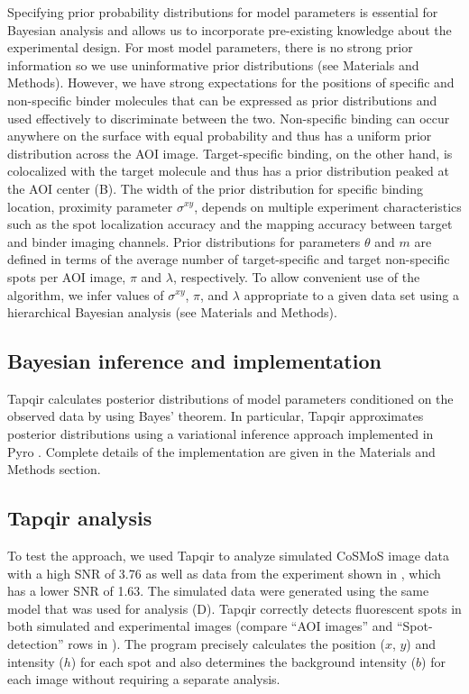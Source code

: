 Specifying prior probability distributions for model parameters is essential for Bayesian analysis and allows us to incorporate pre-existing knowledge about the experimental design. For most model parameters, there is no strong prior information so we use uninformative prior distributions (see Materials and Methods). However, we have strong expectations for the positions of specific and non-specific binder molecules that can be expressed as prior distributions and used effectively to discriminate between the two. Non-specific binding can occur anywhere on the surface with equal probability and thus has a uniform prior distribution across the AOI image. Target-specific binding, on the other hand, is colocalized with the target molecule and thus has a prior distribution peaked at the AOI center (B). The width of the prior distribution for specific binding location, proximity parameter $\sigma^{xy}$, depends on multiple experiment characteristics such as the spot localization accuracy and the mapping accuracy between target and binder imaging channels. Prior distributions for parameters $\theta$ and $m$ are defined in terms of the average number of target-specific and target non-specific spots per AOI image, $\pi$ and $\lambda$, respectively. To allow convenient use of the algorithm, we infer values of $\sigma^{xy}$, $\pi$, and $\lambda$ appropriate to a given data set using a hierarchical Bayesian analysis (see Materials and Methods).



\subsection{Bayesian inference and implementation}

Tapqir calculates posterior distributions of model parameters conditioned on the observed data by using Bayes' theorem. In particular, Tapqir approximates posterior distributions using a variational inference approach implemented in Pyro \citep{Bingham2019-qy}.  Complete details of the implementation are given in the Materials and Methods section.

\subsection{Tapqir analysis}

To test the approach, we used Tapqir to analyze simulated CoSMoS image data with a high SNR of 3.76 as well as data from the experiment shown in , which has a lower SNR of 1.63. The simulated data were generated using the same model that was used for analysis (D). Tapqir correctly detects fluorescent spots in both simulated and experimental images (compare ``AOI images'' and ``Spot-detection'' rows in ). The program precisely calculates the position ($x$, $y$) and intensity ($h$) for each spot and also determines the background intensity ($b$) for each image without requiring a separate analysis. 


